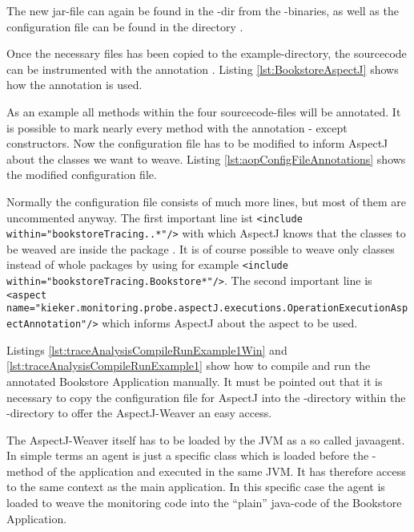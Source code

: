 The new jar-file  can again be found
in the -dir from the \Kieker{}-binaries, as well as the
configuration file \file{\aopConfigFile} can be found in the directory .

Once the necessary files has been copied to the example-directory,
the sourcecode can be instrumented with the annotation .
Listing \ref{lst:BookstoreAspectJ} shows how the annotation is
used.

\setJavaCodeListing


As an example all methods within the four sourcecode-files will be
annotated. It is possible to mark nearly every method with the annotation
- except constructors. Now the configuration file has to be modified to inform AspectJ about the classes we want to weave. Listing \ref{lst:aopConfigFileAnnotations} shows the modified configuration file.
\setXMLListing

Normally the configuration file consists of much more lines, but most of them are uncommented anyway. The first important line ist 
\lstinline$<include within="bookstoreTracing..*"/>$
with which AspectJ knows that the classes to be weaved are inside the package . It is of course possible to weave only classes instead of whole packages by using for example 
\lstinline$<include within="bookstoreTracing.Bookstore*"/>$. The second important line is 
\lstinline$<aspect name="kieker.monitoring.probe.aspectJ.executions.OperationExecutionAspectAnnotation"/>$ which informs AspectJ about the aspect to be used.

Listings \ref{lst:traceAnalysisCompileRunExample1Win} and \ref{lst:traceAnalysisCompileRunExample1} show how to compile and run the annotated Bookstore Application manually. It must be pointed out that it is necessary to copy the configuration file for AspectJ into the -directory within the -directory to offer the AspectJ-Weaver an easy access.

The AspectJ-Weaver itself has to be loaded by the JVM as a so called javaagent. In simple terms an agent is just a specific class which is loaded before the -method of the application and executed in the same JVM. It has therefore access to the same context as the main application. In this specific case the agent is loaded to weave the monitoring code into the ``plain'' java-code of the Bookstore Application.

